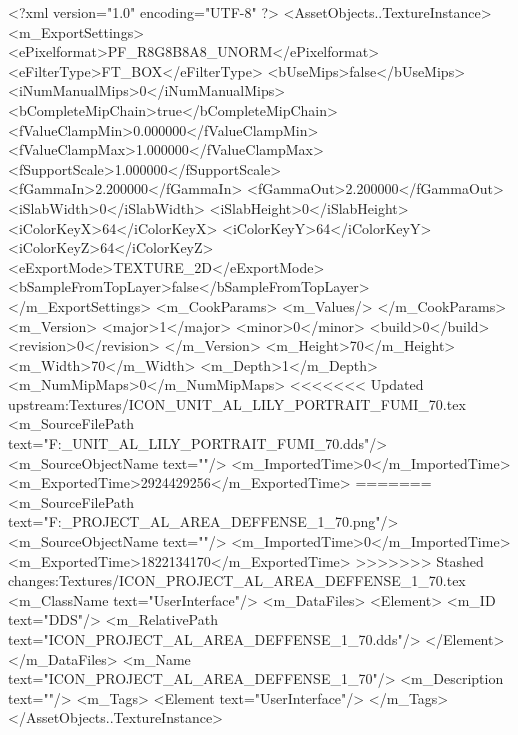 <?xml version="1.0" encoding="UTF-8" ?>
<AssetObjects..TextureInstance>
	<m_ExportSettings>
		<ePixelformat>PF_R8G8B8A8_UNORM</ePixelformat>
		<eFilterType>FT_BOX</eFilterType>
		<bUseMips>false</bUseMips>
		<iNumManualMips>0</iNumManualMips>
		<bCompleteMipChain>true</bCompleteMipChain>
		<fValueClampMin>0.000000</fValueClampMin>
		<fValueClampMax>1.000000</fValueClampMax>
		<fSupportScale>1.000000</fSupportScale>
		<fGammaIn>2.200000</fGammaIn>
		<fGammaOut>2.200000</fGammaOut>
		<iSlabWidth>0</iSlabWidth>
		<iSlabHeight>0</iSlabHeight>
		<iColorKeyX>64</iColorKeyX>
		<iColorKeyY>64</iColorKeyY>
		<iColorKeyZ>64</iColorKeyZ>
		<eExportMode>TEXTURE_2D</eExportMode>
		<bSampleFromTopLayer>false</bSampleFromTopLayer>
	</m_ExportSettings>
	<m_CookParams>
		<m_Values/>
	</m_CookParams>
	<m_Version>
		<major>1</major>
		<minor>0</minor>
		<build>0</build>
		<revision>0</revision>
	</m_Version>
	<m_Height>70</m_Height>
	<m_Width>70</m_Width>
	<m_Depth>1</m_Depth>
	<m_NumMipMaps>0</m_NumMipMaps>
<<<<<<< Updated upstream:Textures/ICON_UNIT_AL_LILY_PORTRAIT_FUMI_70.tex
	<m_SourceFilePath text="F:\DT\lilyimages\gpportrait\ICON_UNIT_AL_LILY_PORTRAIT_FUMI_70.dds"/>
	<m_SourceObjectName text=""/>
	<m_ImportedTime>0</m_ImportedTime>
	<m_ExportedTime>2924429256</m_ExportedTime>
=======
	<m_SourceFilePath text="F:\DT\lilyimages\all\ICON_PROJECT_AL_AREA_DEFFENSE_1_70.png"/>
	<m_SourceObjectName text=""/>
	<m_ImportedTime>0</m_ImportedTime>
	<m_ExportedTime>1822134170</m_ExportedTime>
>>>>>>> Stashed changes:Textures/ICON_PROJECT_AL_AREA_DEFFENSE_1_70.tex
	<m_ClassName text="UserInterface"/>
	<m_DataFiles>
		<Element>
			<m_ID text="DDS"/>
			<m_RelativePath text="ICON_PROJECT_AL_AREA_DEFFENSE_1_70.dds"/>
		</Element>
	</m_DataFiles>
	<m_Name text="ICON_PROJECT_AL_AREA_DEFFENSE_1_70"/>
	<m_Description text=""/>
	<m_Tags>
		<Element text="UserInterface"/>
	</m_Tags>
</AssetObjects..TextureInstance>


